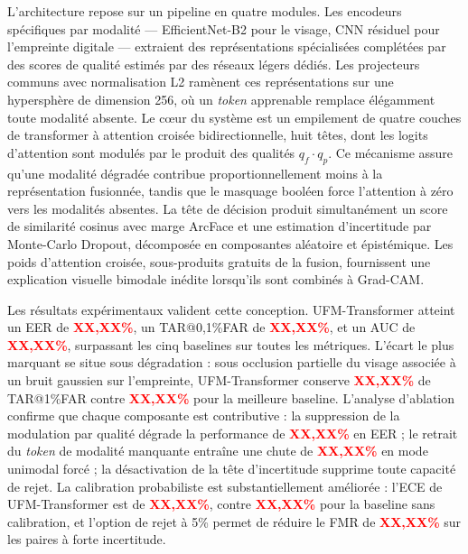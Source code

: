\documentclass[12pt,a4paper]{report}
\begin{document}
L'architecture repose sur un pipeline en quatre modules. Les encodeurs sp\'{e}cifiques par modalit\'{e} --- EfficientNet-B2 pour le visage, CNN r\'{e}siduel pour l'empreinte digitale --- extraient des repr\'{e}sentations sp\'{e}cialis\'{e}es compl\'{e}t\'{e}es par des scores de qualit\'{e} estim\'{e}s par des r\'{e}seaux l\'{e}gers d\'{e}di\'{e}s. Les projecteurs communs avec normalisation L2 ram\`{e}nent ces repr\'{e}sentations sur une hypersph\`{e}re de dimension 256, o\`{u} un \emph{token} apprenable remplace \'{e}l\'{e}gamment toute modalit\'{e} absente. Le c\oe ur du syst\`{e}me est un empilement de quatre couches de transformer \`{a} attention crois\'{e}e bidirectionnelle, huit t\^{e}tes, dont les logits d'attention sont modul\'{e}s par le produit des qualit\'{e}s $q_f \cdot q_p$. Ce m\'{e}canisme assure qu'une modalit\'{e} d\'{e}grad\'{e}e contribue proportionnellement moins \`{a} la repr\'{e}sentation fusionn\'{e}e, tandis que le masquage bool\'{e}en force l'attention \`{a} z\'{e}ro vers les modalit\'{e}s absentes. La t\^{e}te de d\'{e}cision produit simultan\'{e}ment un score de similarit\'{e} cosinus avec marge ArcFace et une estimation d'incertitude par Monte-Carlo Dropout, d\'{e}compos\'{e}e en composantes al\'{e}atoire et \'{e}pist\'{e}mique. Les poids d'attention crois\'{e}e, sous-produits gratuits de la fusion, fournissent une explication visuelle bimodale in\'{e}dite lorsqu'ils sont combin\'{e}s \`{a} Grad-CAM.

Les r\'{e}sultats exp\'{e}rimentaux valident cette conception. UFM-Transformer atteint un EER de \textcolor{red}{\textbf{XX,XX\%}}, un TAR@0,1\%FAR de \textcolor{red}{\textbf{XX,XX\%}}, et un AUC de \textcolor{red}{\textbf{XX,XX\%}}, surpassant les cinq baselines sur toutes les m\'{e}triques. L'\'{e}cart le plus marquant se situe sous d\'{e}gradation : sous occlusion partielle du visage associ\'{e}e \`{a} un bruit gaussien sur l'empreinte, UFM-Transformer conserve \textcolor{red}{\textbf{XX,XX\%}} de TAR@1\%FAR contre \textcolor{red}{\textbf{XX,XX\%}} pour la meilleure baseline. L'analyse d'ablation confirme que chaque composante est contributive : la suppression de la modulation par qualit\'{e} d\'{e}grade la performance de \textcolor{red}{\textbf{XX,XX\%}} en EER ; le retrait du \emph{token} de modalit\'{e} manquante entra\^{i}ne une chute de \textcolor{red}{\textbf{XX,XX\%}} en mode unimodal forc\'{e} ; la d\'{e}sactivation de la t\^{e}te d'incertitude supprime toute capacit\'{e} de rejet. La calibration probabiliste est substantiellement am\'{e}lior\'{e}e : l'ECE de UFM-Transformer est de \textcolor{red}{\textbf{XX,XX\%}}, contre \textcolor{red}{\textbf{XX,XX\%}} pour la baseline sans calibration, et l'option de rejet \`{a} 5\% permet de r\'{e}duire le FMR de \textcolor{red}{\textbf{XX,XX\%}} sur les paires \`{a} forte incertitude.
\end{document}

